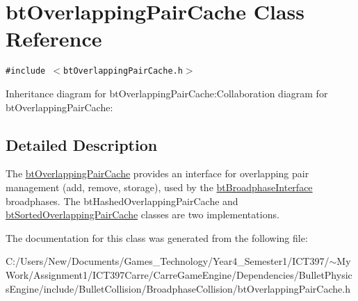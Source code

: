 \hypertarget{classbt_overlapping_pair_cache}{
\section{btOverlappingPairCache Class Reference}
\label{classbt_overlapping_pair_cache}
}
{\tt \#include $<$btOverlappingPairCache.h$>$}

Inheritance diagram for btOverlappingPairCache:Collaboration diagram for btOverlappingPairCache:

\subsection{Detailed Description}
The \hyperlink{classbt_overlapping_pair_cache}{btOverlappingPairCache} provides an interface for overlapping pair management (add, remove, storage), used by the \hyperlink{classbt_broadphase_interface}{btBroadphaseInterface} broadphases. The btHashedOverlappingPairCache and \hyperlink{classbt_sorted_overlapping_pair_cache}{btSortedOverlappingPairCache} classes are two implementations. 

The documentation for this class was generated from the following file:\begin{CompactItemize}
\item 
C:/Users/New/Documents/Games\_\-Technology/Year4\_\-Semester1/ICT397/$\sim$My Work/Assignment1/ICT397Carre/CarreGameEngine/Dependencies/BulletPhysicsEngine/include/BulletCollision/BroadphaseCollision/btOverlappingPairCache.h\end{CompactItemize}
